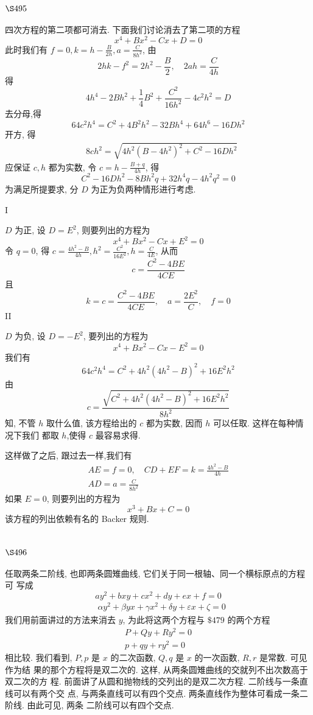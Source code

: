 \section{$\S 495$}

四次方程的第二项都可消去. 下面我们讨论消去了第二项的方程
\[
x^{4}+B x^{2}-C x+D=0
\]
此时我们有 $f=0, k=h-\frac{B}{2 h}, a=\frac{C}{8 h^{2}}$, 由
\[
2 h k-f^{2}=2 h^{2}-\frac{B}{2}, \quad 2 a h=\frac{C}{4 h}
\]
得
\[
4 h^{4}-2 B h^{2}+\frac{1}{4} B^{2}+\frac{C^{2}}{16 h^{2}}-4 c^{2} h^{2}=D
\]
去分母,得
\[
64 c^{2} h^{4}=C^{2}+4 B^{2} h^{2}-32 B h^{4}+64 h^{6}-16 D h^{2}
\]
开方, 得
\[
\begin{aligned}
& 8 c h^{2}=\sqrt{4 h^{2}\left(B-4 h^{2}\right)^{2}+C^{2}-16 D h^{2}}
\end{aligned}
\]
应保证 $c, h$ 都为实数, 令 $c=h-\frac{B+q}{4 h}$, 得
\[
C^{2}-16 D h^{2}-8 B h^{2} q+32 h^{4} q-4 h^{2} q^{2}=0
\]
为满足所提要求, 分 $D$ 为正为负两种情形进行考虑.

I

$D$ 为正, 设 $D=E^{2}$, 则要列出的方程为
\[
x^{4}+B x^{2}-C x+E^{2}=0
\]
令 $q=0$, 得 $c=\frac{4 h^{2}-B}{4 h}, h^{2}=\frac{C^{2}}{16 E^{2}}, h=\frac{C}{4 E}$, 从而
\[
c=\frac{C^{2}-4 B E}{4 C E}
\]
且
\[
k=c=\frac{C^{2}-4 B E}{4 C E}, \quad a=\frac{2 E^{2}}{C}, \quad f=0
\]
II

$D$ 为负, 设 $D=-E^{2}$, 要列出的方程为
\[
x^{4}+B x^{2}-C x-E^{2}=0
\]
我们有
\[
64 c^{2} h^{4}=C^{2}+4 h^{2}\left(4 h^{2}-B\right)^{2}+16 E^{2} h^{2}
\]
由
\[
c=\frac{\sqrt{C^{2}+4 h^{2}\left(4 h^{2}-B\right)^{2}+16 E^{2} h^{2}}}{8 h^{2}}
\]
知, 不管 $h$ 取什么值, 该方程给出的 $c$ 都为实数, 因而 $h$ 可以任取. 这样在每种情况下我们 都取 $h$,使得 $c$ 最容易求得.

这样做了之后, 跟过去一样,我们有
\[
\begin{gathered}
A E=f=0, \quad C D+E F=k=\frac{4 h^{2}-B}{4 h} \\
A D=a=\frac{C}{8 h^{2}}
\end{gathered}
\]
如果 $E=0$, 则要列出的方程为
\[
x^{3}+B x+C=0
\]
该方程的列出依赖有名的 Backer 规则.

\section{$\S 496$}

任取两条二阶线, 也即两条圆雉曲线, 它们关于同一根轴、同一个横标原点的方程可 写成
\[
a y^{2}+b x y+c x^{2}+d y+e x+f=0
\]
\[
\begin{aligned}
& \alpha y^{2}+\beta y x+\gamma x^{2}+\delta y+\varepsilon x+\zeta=0
\end{aligned}
\]
我们用前面讲过的方法来消去 $y$, 为此将这两个方程与 $\$ 479$ 的两个方程
\[
\begin{gathered}
P+Q y+R y^{2}=0 \\
p+q y+r y^{2}=0
\end{gathered}
\]
相比较. 我们看到, $P, p$ 是 $x$ 的二次函数, $Q, q$ 是 $x$ 的一次函数, $R, r$ 是常数. 可见作为结 果的那个方程将是双二次的. 这样, 从两条圆雉曲线的交就列不出次数高于双二次的方 程. 前面讲了从圆和抛物线的交列出的是双二次方程. 二阶线与一条直线可以有两个交 点, 与两条直线可以有四个交点. 两条直线作为整体可看成一条二阶线. 由此可见, 两条 二阶线可以有四个交点.

